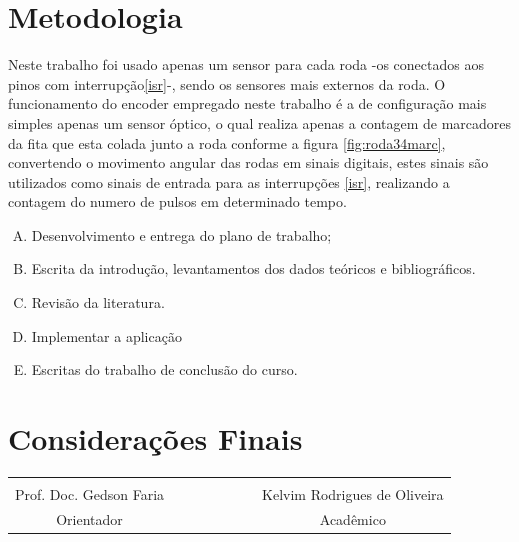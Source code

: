 \documentclass[a4paper,12pt,portuguese]{ufms-cpcx}
\begin{document}
\chapter{Metodologia} \label{cap: metodologia}
Neste trabalho foi usado apenas um sensor para cada roda -os conectados aos pinos com interrupção\ref{isr}-, sendo os sensores mais externos da roda.
O funcionamento do encoder empregado neste trabalho é a de configuração mais simples apenas um sensor óptico, o qual realiza apenas a contagem de marcadores da fita que esta colada junto a roda conforme a figura \ref{fig:roda34marc}, convertendo o movimento angular das rodas em sinais digitais, estes sinais são utilizados como sinais de entrada para as interrupções \ref{isr}, realizando a contagem do numero de pulsos em determinado tempo.


\begin{enumerate}[(A)]
	
	\item Desenvolvimento e entrega do plano de trabalho;
	\item Escrita da introdução, levantamentos dos dados teóricos e bibliográficos.
	\item Revisão da literatura. 
	\item Implementar a aplicação
	\item Escritas do trabalho de conclusão do curso.		
	
	
\end{enumerate}

\chapter{Considerações Finais}


\vskip 10cm
\begin{table}[!h]
	\renewcommand{\arraystretch}{1.3}
	\centering
	\begin{tabular}{cccccccc}
		& & & & & & & \\
		Prof. Doc. Gedson Faria & & & & & & & Kelvim Rodrigues de Oliveira \\
		Orientador & & & & & & & Acadêmico \\
	\end{tabular}
\end{table}


\cleardoublepage
{} 

% 

%
\end{document}

